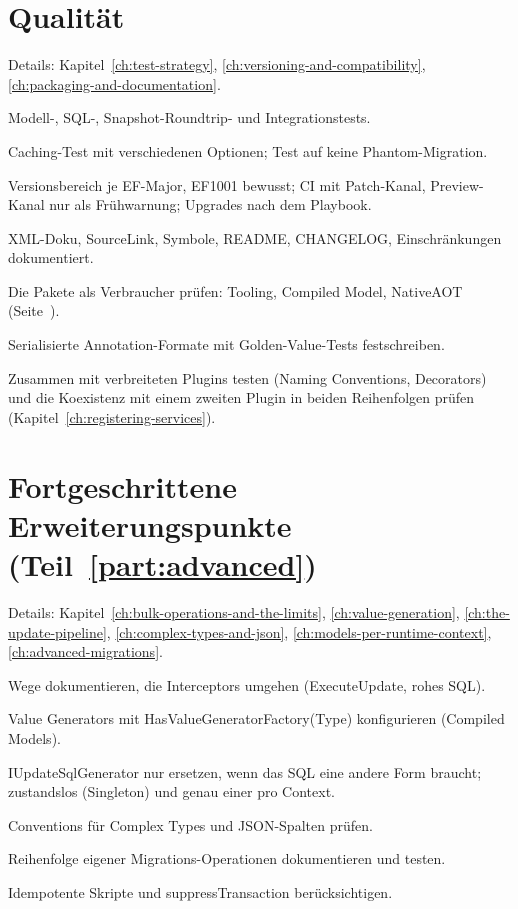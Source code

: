\section{Qualität}

\noindent Details: Kapitel~\ref{ch:test-strategy}, \ref{ch:versioning-and-compatibility}, \ref{ch:packaging-and-documentation}.

\begin{checklist}
  \item Modell-, SQL-, Snapshot-Roundtrip- und Integrationstests.
  \item Caching-Test mit verschiedenen Optionen; Test auf keine Phantom-Migration.
  \item Versionsbereich je EF-Major, EF1001 bewusst; CI mit Patch-Kanal, Preview-Kanal nur als
    Frühwarnung; Upgrades nach dem Playbook.
  \item XML-Doku, SourceLink, Symbole, README, CHANGELOG, Einschränkungen dokumentiert.
  \item Die Pakete als Verbraucher prüfen: Tooling, Compiled Model, NativeAOT
    (Seite~\pageref{sec:consumer-test}).
  \item Serialisierte Annotation-Formate mit Golden-Value-Tests festschreiben.
  \item Zusammen mit verbreiteten Plugins testen (Naming Conventions, Decorators) und die
    Koexistenz mit einem zweiten Plugin in beiden Reihenfolgen prüfen
    (Kapitel~\ref{ch:registering-services}).
\end{checklist}

\section{Fortgeschrittene Erweiterungspunkte (Teil~\ref{part:advanced})}

\noindent Details: Kapitel~\ref{ch:bulk-operations-and-the-limits}, \ref{ch:value-generation}, \ref{ch:the-update-pipeline}, \ref{ch:complex-types-and-json}, \ref{ch:models-per-runtime-context}, \ref{ch:advanced-migrations}.

\begin{checklist}
  \item Wege dokumentieren, die Interceptors umgehen (ExecuteUpdate, rohes SQL).
  \item Value Generators mit HasValueGeneratorFactory(Type) konfigurieren (Compiled Models).
  \item IUpdateSqlGenerator nur ersetzen, wenn das SQL eine andere Form braucht; zustandslos
    (Singleton) und genau einer pro Context.
  \item Conventions für Complex Types und JSON-Spalten prüfen.
  \item Reihenfolge eigener Migrations-Operationen dokumentieren und testen.
  \item Idempotente Skripte und suppressTransaction berücksichtigen.
\end{checklist}

